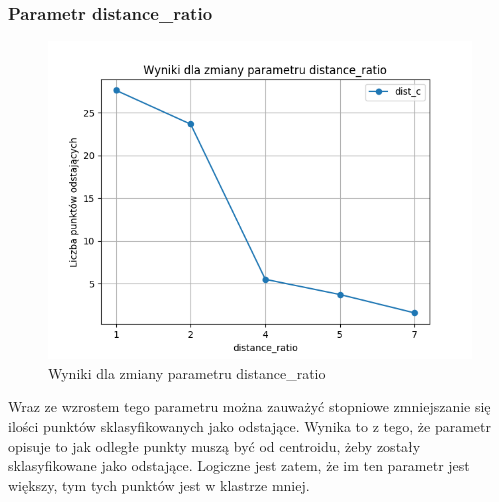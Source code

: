 \documentclass[eng,printmode]{mgr}
\begin{document}
\subsubsection{Parametr distance\_ratio}
\begin{figure}[H]
  \begin{center}
  \includegraphics[scale=0.7]{avg_distance_ratio}
  \end{center}
  \caption{Wyniki dla zmiany parametru distance\_ratio}
  \label{fig:avg_distance_ratio}
\end{figure}
Wraz ze wzrostem tego parametru można zauważyć stopniowe zmniejszanie się ilości punktów sklasyfikowanych jako odstające. Wynika to z tego, że parametr opisuje to jak odległe punkty muszą być od centroidu, żeby zostały sklasyfikowane jako odstające. Logiczne jest zatem, że im ten parametr jest większy, tym tych punktów jest w klastrze mniej.
\end{document}
